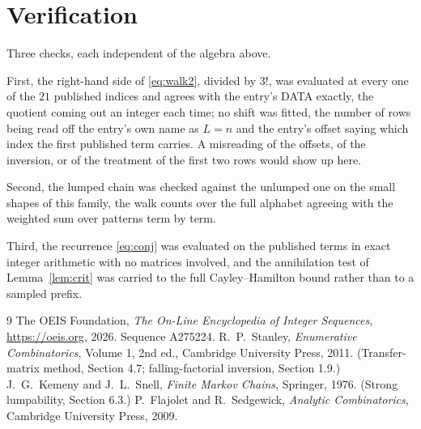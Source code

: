 \documentclass[11pt,a4paper]{article}
\theoremstyle{plain}
\theoremstyle{definition}
\begin{document}
\section{Verification}

Three checks, each independent of the algebra above.

First, the right-hand side of \eqref{eq:walk2}, divided by $3!$, was evaluated at every
one of the $21$ published indices and agrees with the entry's DATA exactly, the quotient
coming out an integer each time; no shift was fitted, the number of rows being read off the
entry's own name as $L=n$ and the entry's offset saying which index the first published
term carries. A misreading of the offsets, of the inversion, or of the treatment of the first
two rows would show up here.

Second, the lumped chain was checked against the unlumped one on the small shapes of this
family, the walk counts over the full alphabet agreeing with the weighted sum over patterns
term by term.

Third, the recurrence \eqref{eq:conj} was evaluated on the published terms in exact integer
arithmetic with no matrices involved, and the annihilation test of Lemma~\ref{lem:crit} was
carried to the full Cayley--Hamilton bound rather than to a sampled prefix.

\begin{thebibliography}{9}
 The OEIS Foundation, \emph{The On-Line Encyclopedia of Integer
Sequences}, \url{https://oeis.org}, 2026. Sequence A275224.
 R.~P.~Stanley, \emph{Enumerative Combinatorics}, Volume 1, 2nd ed.,
Cambridge University Press, 2011. (Transfer-matrix method, Section 4.7; falling-factorial
inversion, Section 1.9.)
 J.~G.~Kemeny and J.~L.~Snell, \emph{Finite Markov Chains}, Springer,
1976. (Strong lumpability, Section 6.3.)
 P.~Flajolet and R.~Sedgewick, \emph{Analytic Combinatorics}, Cambridge
University Press, 2009.
\end{thebibliography}
\end{document}
